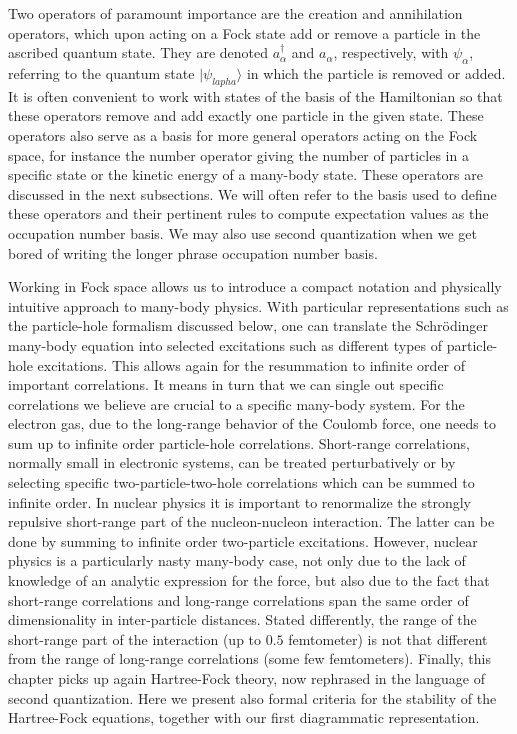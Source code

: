 Two operators of paramount importance are the creation and annihilation operators, which upon 
acting on a Fock state add or remove a particle in the ascribed quantum state. 
They are denoted $a^{\dagger}_{\alpha}$ and $a_{\alpha}$, respectively, with $\psi_{\alpha}$, 
referring to the quantum state $|\psi_{lapha}\rangle$ in which the particle is removed or added. 
It is often convenient to work with states of the basis of the Hamiltonian so that these operators 
remove and add exactly one particle in the given state. These operators also serve as a basis for 
more general operators acting on the Fock space, for instance the number operator giving the number of particles 
in a specific state or the kinetic energy of  a many-body state. These operators are discussed in the next subsections.
We will often  refer to the basis used to define these operators and their pertinent rules to compute 
expectation values as the occupation number basis. We may also use second quantization when we get bored
of writing the longer phrase occupation number basis. 


Working in Fock space allows us to introduce a compact notation and physically intuitive 
approach to many-body physics.
With particular representations such as the particle-hole formalism discussed below, one can translate the Schr\"odinger many-body equation 
into selected excitations such as different types of particle-hole excitations.  
This allows again for the resummation to infinite order
of important correlations. It means in turn that we can single out specific correlations we believe are crucial to a specific many-body 
system.  
For the electron gas, due to the long-range behavior
of the Coulomb force, one needs to sum up to infinite order particle-hole correlations. Short-range correlations, normally small
in electronic systems, can be treated perturbatively or by selecting specific two-particle-two-hole correlations which can be summed
to infinite order. 
In nuclear physics it is important to renormalize the strongly repulsive short-range part of the nucleon-nucleon interaction.  
The latter can be done by summing to infinite order two-particle excitations.  However, nuclear physics is a particularly nasty many-body case,
not only due to the lack of knowledge of an analytic expression for the  force, but also due to the fact that short-range correlations
and long-range correlations span the same order of dimensionality in inter-particle distances. Stated differently, the range of the short-range 
part of the interaction (up to $0.5$ femtometer) is not that different from the range of long-range correlations (some few femtometers).  Finally,  this chapter picks up again Hartree-Fock theory, now rephrased in the language of
second quantization. Here we present also formal criteria for the stability of the Hartree-Fock equations, together with our first diagrammatic representation.



